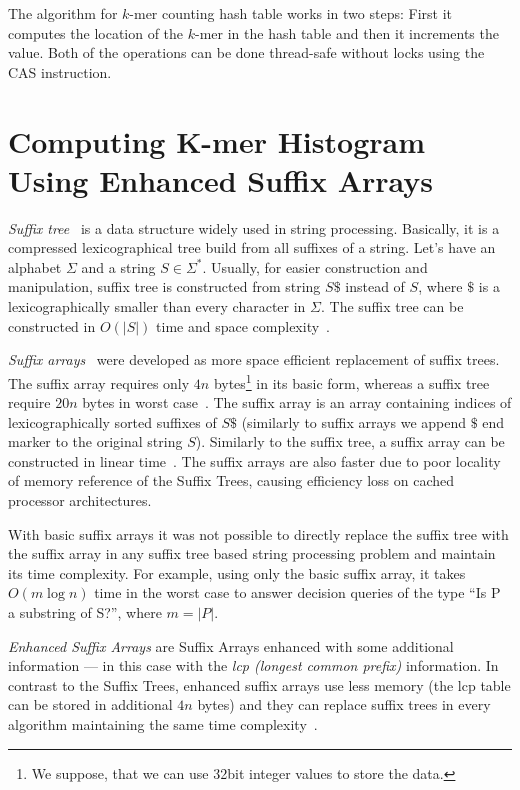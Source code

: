 The algorithm for $k$-mer counting hash table works in two steps:
First it computes the location of the $k$-mer in the hash table and then it increments the value. Both of the operations can be done thread-safe without locks using the CAS instruction.

\section[Enhanced Suffix Arrays]{Computing K-mer Histogram Using Enhanced Suffix Arrays}

\emph{Suffix tree}~\cite{suffixtree} is a data structure widely used in string processing. Basically, it is a compressed lexicographical tree build from all suffixes of a string. Let's have an alphabet $\Sigma$ and a string $S \in \Sigma^*$. Usually, for easier construction and manipulation, suffix tree is constructed from string $S\$$ instead of $S$, where $\$$ is a lexicographically smaller than every character in $\Sigma$. The suffix tree can be constructed in $O(|S|)$ time and space complexity~\cite{suffixtree}.

\emph{Suffix arrays}~\cite{suffixarray} were developed as more space efficient replacement of suffix trees. The suffix array requires only $4n$ bytes\footnote{We suppose, that we can use 32bit integer values to store the data.} in its basic form, whereas a suffix tree require $20n$ bytes in worst case~\cite{kurtz1999reducing}. The suffix array is an array containing indices of lexicographically sorted suffixes of $S\$$ (similarly to suffix arrays we append $\$$ end marker to the original string $S$). Similarly to the suffix tree, a suffix array can be constructed in linear time~\cite{karkkainen2003simple, kim2003linear, ko2003space}. The suffix arrays are also faster due to poor locality of memory reference of the Suffix Trees, causing efficiency loss on cached processor architectures.

With basic suffix arrays it was not possible to directly replace the suffix tree with the suffix array in any suffix tree based string processing problem and maintain its time complexity. For example, using only the basic suffix array, it takes $O(m \log n)$ time in the worst case to answer decision queries of the type ``Is P a substring of S?'', where $m = |P|$.

\emph{Enhanced Suffix Arrays} are Suffix Arrays enhanced with some additional information --- in this case with the \emph{lcp (longest common prefix)} information.
In contrast to the Suffix Trees, enhanced suffix arrays use less memory (the lcp table can be stored in additional $4n$ bytes) and they can replace suffix trees in every algorithm maintaining the same time complexity~\cite{enhancedsuffixarrays}.


